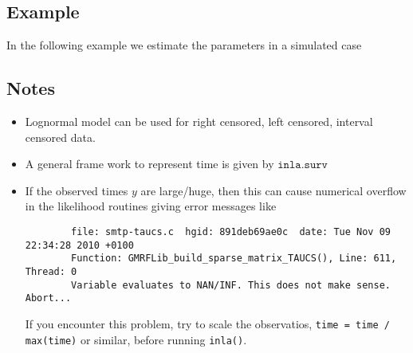 \documentclass[a4paper,11pt]{article}
\begin{document}
\subsection*{Example}

In the following example we estimate the parameters in a simulated
case 

\subsection*{Notes}

\begin{itemize}
\item Lognormal model can be used for right censored, left censored,
    interval censored data.
\item A general frame work to represent time is given by
    $\texttt{inla.surv}$
\item If the observed times $y$ are large/huge, then this can cause
    numerical overflow in the likelihood routines giving error
    messages like
\begin{verbatim}
        file: smtp-taucs.c  hgid: 891deb69ae0c  date: Tue Nov 09 22:34:28 2010 +0100
        Function: GMRFLib_build_sparse_matrix_TAUCS(), Line: 611, Thread: 0
        Variable evaluates to NAN/INF. This does not make sense. Abort...
\end{verbatim}
    If you encounter this problem, try to scale the observatios,
    \verb|time = time / max(time)| or similar, before running
    \verb|inla()|. 
\end{itemize}
\end{document}
